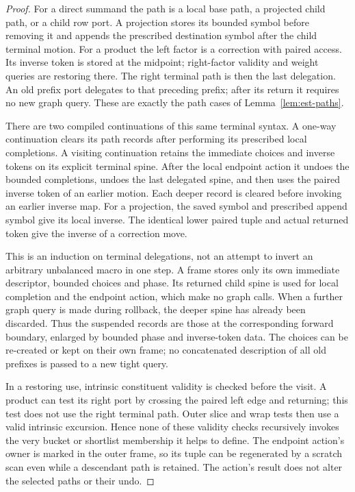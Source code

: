 \begin{proof}
For a direct summand the path is a local base path, a projected child
path, or a child row port.  A projection stores its bounded symbol
before removing it and appends the prescribed destination symbol after
the child terminal motion.  For a product the left factor is a
correction with paired access.  Its inverse token is stored at the
midpoint; right-factor validity and weight queries are restoring there.
The right terminal path is then the last delegation.  An old prefix
port delegates to that preceding prefix; after its return it requires
no new graph query.  These are exactly the path cases of
Lemma~\ref{lem:est-paths}.

There are two compiled continuations of this same terminal syntax.  A
one-way continuation clears its path records after performing its
prescribed local completions.  A visiting continuation retains the
immediate choices and inverse tokens on its explicit terminal spine.
After the local endpoint action it undoes the bounded completions,
undoes the last delegated spine, and then uses the paired inverse token
of an earlier motion.  Each deeper record is cleared before invoking an
earlier inverse map.  For a projection, the saved symbol and prescribed
append symbol give its local inverse.  The identical lower paired tuple
and actual returned token give the inverse of a correction move.

This is an induction on terminal delegations, not an attempt to invert
an arbitrary unbalanced macro in one step.  A frame stores only its own
immediate descriptor, bounded choices and phase.  Its returned child
spine is used for local completion and the endpoint action, which make
no graph calls.  When a further graph query is made during rollback,
the deeper spine has already been discarded.  Thus the suspended
records are those at the corresponding forward boundary, enlarged by
bounded phase and inverse-token data.  The choices can be re-created or
kept on their own frame; no concatenated description of all old
prefixes is passed to a new tight query.

In a restoring use, intrinsic constituent validity is checked before
the visit.  A product can test its right port by crossing the paired
left edge and returning; this test does not use the right terminal
path.  Outer slice and wrap tests then use a valid intrinsic excursion.
Hence none of these validity checks recursively invokes the very
bucket or shortlist membership it helps to define.  The endpoint
action's owner is marked in the outer frame, so its tuple can be
regenerated by a scratch scan even while a descendant path is retained.
The action's result does not alter the selected paths or their undo.
\end{proof}


